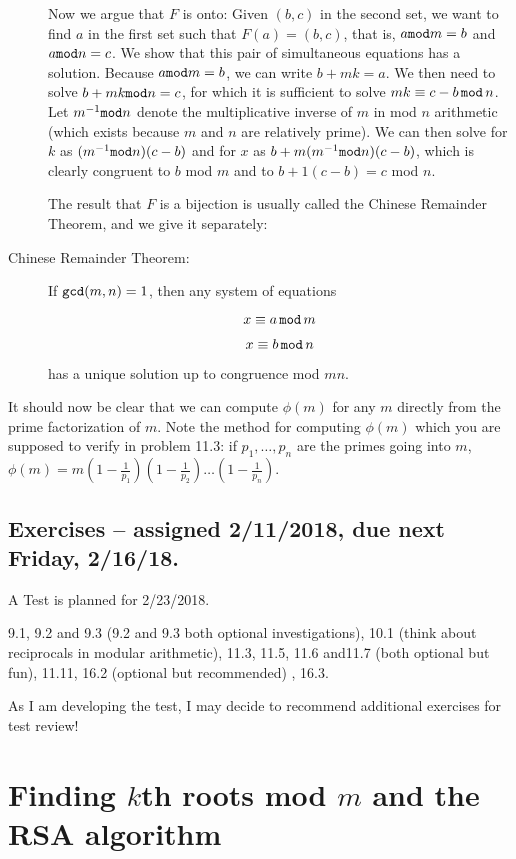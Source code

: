\documentclass[12pt]{article}
\begin{document}
\begin{description}
Now we argue that $F$ is onto:   Given $(b,c)$ in the second set, we want to find $a$ in the first set such that $F(a)=(b,c)$, that is, $a{\tt mod}m=b$ and $a{\tt mod}n=c$.   We show that this pair of simultaneous equations has a solution.
Because $a{\tt mod}m=b$, we can write $b+mk=a$.   We then need to solve $b+mk{\tt mod}n=c$, for which it is sufficient to solve $mk\equiv c-b\,{\tt mod}\,n$.   Let $m^{-1}{\tt mod}n$ denote the multiplicative inverse of $m$ in mod $n$ arithmetic (which exists because $m$ and $n$ are relatively prime).  We can then solve for $k$ as $(m^{-1}{\tt mod}n)(c-b)$ and for $x$ as $b+m(m^{-1}{\tt mod}n)(c-b)$, which is clearly congruent to $b$ mod $m$ and to $b+1(c-b)=c$ mod $n$.

The result that $F$ is a bijection is usually called the Chinese Remainder Theorem, and we give it separately:

\item[Chinese Remainder Theorem:]   If ${\tt gcd}(m,n)=1$, then any system of equations

$$x\equiv a\,{\tt mod}\,m$$

$$x \equiv b\,{\tt mod}\,n$$

has a unique solution up to congruence mod $mn$.

\end{description}

It should now be clear that we can compute $\phi(m)$ for any $m$ directly from the prime factorization of $m$.   Note the method for computing $\phi(m)$ which you are supposed to verify in problem 11.3:
if $p_1,\ldots,p_n$ are the primes going into $m$, $\phi(m)=m(1-\frac1{p_1})(1-\frac1{p_2})\ldots(1-\frac1{p_n})$.

\subsection{Exercises -- assigned 2/11/2018, due next Friday, 2/16/18.}

A Test is planned for 2/23/2018.

9.1, 9.2 and 9.3 (9.2 and 9.3 both optional investigations), 10.1 (think about reciprocals in modular arithmetic), 11.3, 11.5, 11.6 and11.7 (both optional but fun), 11.11, 16.2 (optional but recommended) , 16.3.

As I am developing the test, I may decide to recommend additional exercises for test review!

\section{Finding $k$th roots mod $m$ and the RSA algorithm}
\end{document}
